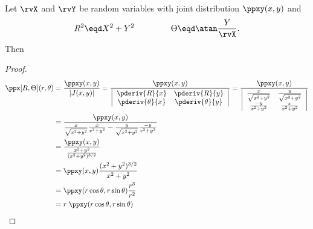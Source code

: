 \begin{proposition}
\label{prop:XY->RT}
Let $\rvX$ and $\rvY$ be random variables with joint distribution
$\ppxy(x,y)$ and
\[ R^2 \eqd X^2 + Y^2 \hspace{10ex} \Theta \eqd \atan\frac{Y}{\rvX}. \]
Then
\end{proposition}
\begin{proof}
\begin{align*}
  \ppx[R,\Theta](r,\theta)
    &= \frac{\ppxy(x,y)}{|J(x,y)|}
     =  \frac{\ppxy(x,y)}{
        \left|\begin{array}{cc}
          \pderiv{R}{x}      & \pderiv{R}{y}   \\
          \pderiv{\theta}{x} & \pderiv{\theta}{y}
        \end{array}\right|
        }
     =  \frac{\ppxy(x,y)}{
        \left|\begin{array}{cc}
          \frac{ x}{\sqrt{x^2+y^2}}  & \frac{y}{\sqrt{x^2+y^2}}   \\
          \frac{-y}{x^2+y^2}         & \frac{x}{x^2+y^2}
        \end{array}\right|
        }
  \\&= \frac{\ppxy(x,y)}{
         \frac{x}{\sqrt{x^2+y^2}}\frac{x}{x^2+y^2}  -
         \frac{y}{\sqrt{x^2+y^2}}\frac{-y}{x^2+y^2}
       }
  \\&= \frac{\ppxy(x,y)}{
         \frac{x^2+y^2}{(x^2+y^2)^{3/2}}
       }
  \\&= \ppxy(x,y)\frac{(x^2+y^2)^{3/2}}{x^2+y^2}
  \\&= \ppxy(r\cos\theta,r\sin\theta)\frac{r^3}{r^2}
  \\&= r\;\ppxy(r\cos\theta,r\sin\theta)
\end{align*}
\end{proof}


